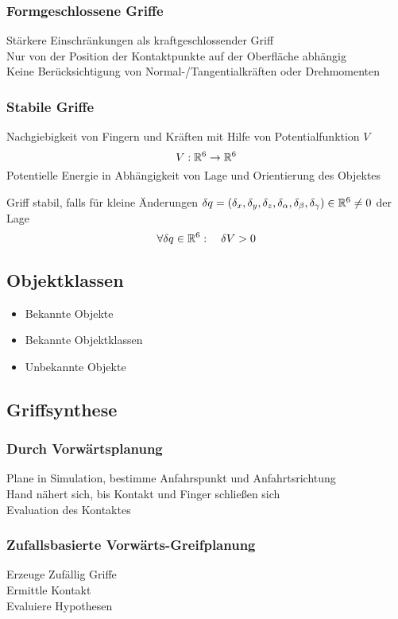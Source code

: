 \subsubsection{Formgeschlossene Griffe}
Stärkere Einschränkungen als kraftgeschlossender Griff\\
Nur von der Position der Kontaktpunkte auf der Oberfläche abhängig\\
Keine Berücksichtigung von Normal-/Tangentialkräften oder Drehmomenten

\subsubsection{Stabile Griffe}
Nachgiebigkeit von Fingern und Kräften mit Hilfe von Potentialfunktion \(V\)
\[V : \mathbb{R}^6 \rightarrow \mathbb{R}^6\]
Potentielle Energie in Abhängigkeit von Lage und Orientierung des Objektes

Griff stabil, falls für kleine Änderungen \(\delta q = (\delta_x, \delta_y, \delta_z, \delta_\alpha,\delta_\beta, \delta_\gamma) \in
\mathbb{R}^6 \neq 0\) der Lage
\[\forall \delta q \in \mathbb{R}^6: \quad \delta V > 0\]


\subsection{Objektklassen}
\begin{itemize}
\item Bekannte Objekte
\item Bekannte Objektklassen
\item Unbekannte Objekte
\end{itemize}

\subsection{Griffsynthese}
\subsubsection{Durch Vorwärtsplanung}
Plane in Simulation, bestimme Anfahrspunkt und Anfahrtsrichtung\\
Hand nähert sich, bis Kontakt und Finger schließen sich\\
Evaluation des Kontaktes\\


\subsubsection{Zufallsbasierte Vorwärts-Greifplanung}
Erzeuge Zufällig Griffe\\
Ermittle Kontakt\\
Evaluiere Hypothesen\\

